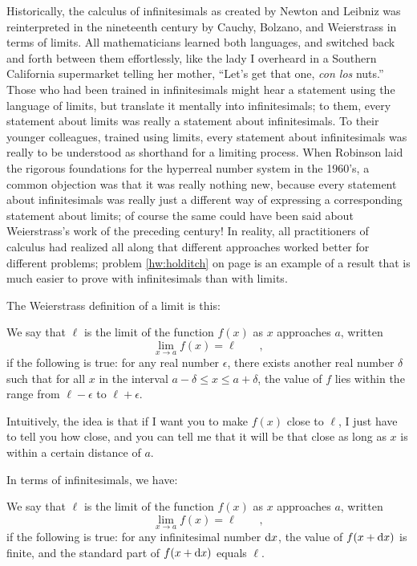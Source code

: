 Historically, the calculus of infinitesimals as created by Newton and Leibniz was reinterpreted
in the nineteenth century by Cauchy, Bolzano, and Weierstrass in terms of limits. All mathematicians
learned both languages, and switched back and forth between them effortlessly, like the lady I
overheard in a Southern California supermarket telling her mother, ``Let's get that one, \emph{con los} nuts.''
Those who had been trained in infinitesimals might hear a statement using the language of limits, but
translate it mentally into infinitesimals; to them, every statement about limits was really a statement
about infinitesimals. To their younger colleagues, trained using limits, every statement about infinitesimals
was really to be understood as shorthand for a limiting process. When Robinson laid the rigorous foundations
for the hyperreal number system in the 1960's, a common objection was that it was really nothing new, because
every statement about infinitesimals was really just a different way of expressing a corresponding statement
about limits; of course the same could have been said about Weierstrass's work of the preceding century!
In reality, all practitioners of calculus had realized all along that different approaches worked better for
different problems; problem \ref{hw:holditch} on page \pageref{hw:holditch} is an example of a result that
is much easier to prove with infinitesimals than with limits.

The Weierstrass definition of a limit is this:
\begin{important}
We say that $\ell$ is the limit of the function $f(x)$ as $x$ approaches $a$, written
\begin{equation*}
  \lim_{x\rightarrow a} f(x) = \ell \qquad ,
\end{equation*}
if the following is true: for any real number $\epsilon$, there exists another real number
$\delta$ such that for all $x$ in the interval $a-\delta\le x \le a+\delta$,
the value of $f$ lies within the range from $\ell-\epsilon$ to $\ell+\epsilon$.
\end{important}
Intuitively, the idea is that if I want you to make $f(x)$ close to $\ell$, I just have
to tell you how close, and you can tell me that it will be that close as long as
$x$ is within a certain distance of $a$.

In terms of infinitesimals, we have:
\begin{important}
We say that $\ell$ is the limit of the function $f(x)$ as $x$ approaches $a$, written
\begin{equation*}
  \lim_{x\rightarrow a} f(x) = \ell \qquad ,
\end{equation*}
if the following is true: for any infinitesimal number $\textup{d} x$, 
the value of $f(x+\textup{d} x)$ is finite, and the standard
part of $f(x+\textup{d} x)$ equals $\ell$.
\end{important}

